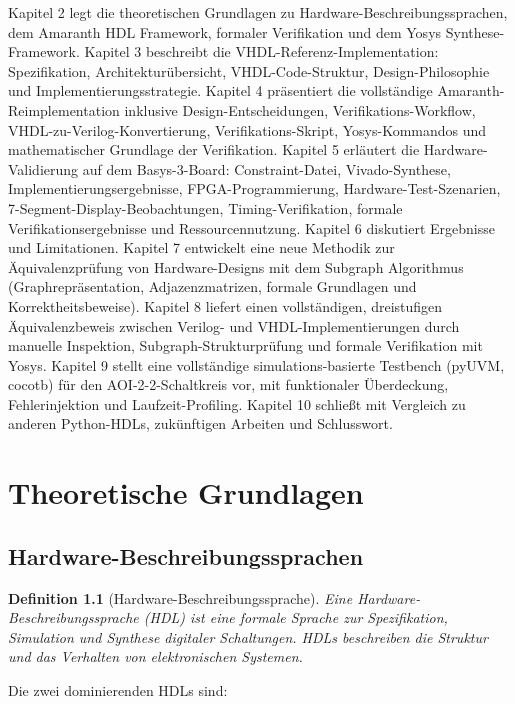 ﻿\documentclass[12pt,a4paper]{report}
\newtheorem{definition}{Definition}[section]
\begin{document}
Kapitel 2 legt die theoretischen Grundlagen zu Hardware-Beschreibungssprachen, dem Amaranth HDL Framework, formaler Verifikation und dem Yosys Synthese-Framework. Kapitel 3 beschreibt die VHDL-Referenz-Implementation: Spezifikation, Architekturübersicht, VHDL-Code-Struktur, Design-Philosophie und Implementierungsstrategie. Kapitel 4 präsentiert die vollständige Amaranth-Reimplementation inklusive Design-Entscheidungen, Verifikations-Workflow, VHDL-zu-Verilog-Konvertierung, Verifikations-Skript, Yosys-Kommandos und mathematischer Grundlage der Verifikation. Kapitel 5 erläutert die Hardware-Validierung auf dem Basys-3-Board: Constraint-Datei, Vivado-Synthese, Implementierungsergebnisse, FPGA-Programmierung, Hardware-Test-Szenarien, 7-Segment-Display-Beobachtungen, Timing-Verifikation, formale Verifikationsergebnisse und Ressourcennutzung. Kapitel 6 diskutiert Ergebnisse und Limitationen. Kapitel 7 entwickelt eine neue Methodik zur Äquivalenzprüfung von Hardware-Designs mit dem Subgraph Algorithmus (Graphrepräsentation, Adjazenzmatrizen, formale Grundlagen und Korrektheitsbeweise). Kapitel 8 liefert einen vollständigen, dreistufigen Äquivalenzbeweis zwischen Verilog- und VHDL-Implementierungen durch manuelle Inspektion, Subgraph-Strukturprüfung und formale Verifikation mit Yosys. Kapitel 9 stellt eine vollständige simulations-basierte Testbench (pyUVM, cocotb) für den AOI-2-2-Schaltkreis vor, mit funktionaler Überdeckung, Fehlerinjektion und Laufzeit-Profiling. Kapitel 10 schließt mit Vergleich zu anderen Python-HDLs, zukünftigen Arbeiten und Schlusswort.

\chapter{Theoretische Grundlagen}

\section{Hardware-Beschreibungssprachen}

\begin{definition}[Hardware-Beschreibungssprache]
Eine Hardware-Beschreibungssprache (HDL) ist eine formale Sprache zur Spezifikation, Simulation und Synthese digitaler Schaltungen. HDLs beschreiben die Struktur und das Verhalten von elektronischen Systemen.
\end{definition}

Die zwei dominierenden HDLs sind:
\end{document}
